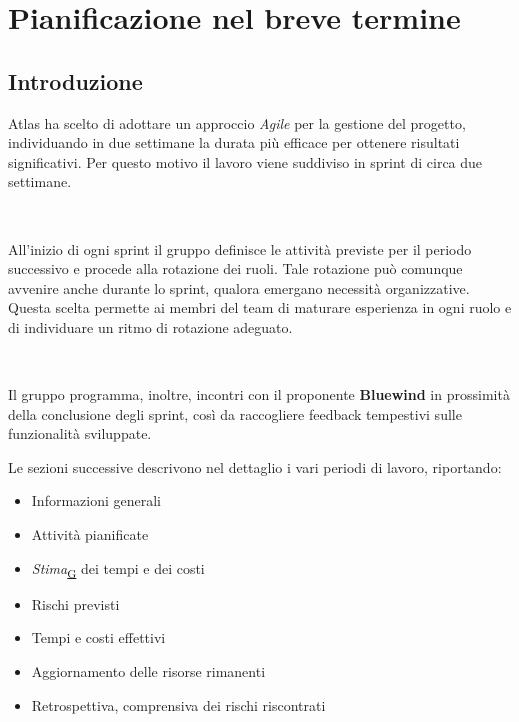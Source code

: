 \documentclass[a4paper,12pt]{article}
\begin{document}
\newpage

\section{Pianificazione nel breve termine}
    \subsection{Introduzione}{
        Atlas ha scelto di adottare un approccio \textit{Agile} per la gestione del progetto, individuando in due settimane la durata più efficace per ottenere risultati significativi. Per questo motivo il lavoro viene suddiviso in sprint di circa due settimane.

        \

        \noindent All'inizio di ogni sprint il gruppo definisce le attività previste per il periodo successivo e procede alla rotazione dei ruoli. Tale rotazione può comunque avvenire anche durante lo sprint, qualora emergano necessità organizzative. Questa scelta permette ai membri del team di maturare esperienza in ogni ruolo e di individuare un ritmo di rotazione adeguato.

        \ 

        \noindent Il gruppo programma, inoltre, incontri con il proponente \textbf{Bluewind} in prossimità della conclusione degli sprint, così da raccogliere feedback tempestivi sulle funzionalità sviluppate.

        Le sezioni successive descrivono nel dettaglio i vari periodi di lavoro, riportando:
        \begin{itemize}
            \item Informazioni generali  
            \item Attività pianificate  
            \item \textit{Stima}\textsubscript{\href{https://atlasteam9.github.io/Atlas/glossario.html\#Stima}{G}} dei tempi e dei costi  
            \item Rischi previsti  
            \item Tempi e costi effettivi  
            \item Aggiornamento delle risorse rimanenti  
            \item Retrospettiva, comprensiva dei rischi riscontrati
        \end{itemize}
    }
    
\end{document}
